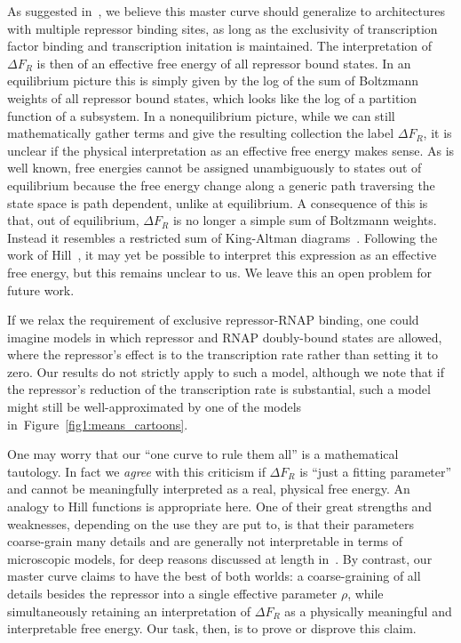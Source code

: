 \documentclass[12pt]{article}%
\newcommand{\fig}[1]{Figure~\ref{#1}}
\begin{document}
As suggested in~\cite{Chure2019}, we believe this master curve
should generalize to architectures with multiple repressor
binding sites, as long as the exclusivity of transcription factor
binding and transcription initation is maintained. The
interpretation of $\Delta F_R$ is then of an effective free
energy of all repressor bound states.
In an equilibrium picture this is simply given by the log of the
sum of Boltzmann weights of all repressor bound states, which
looks like the log of a partition function of a subsystem.
In a nonequilibrium picture, while we can still mathematically gather
terms and give the resulting collection the label $\Delta F_R$,
it is unclear if the physical interpretation as an effective free energy
makes sense.
As is well known, free energies cannot be assigned unambiguously
to states out of equilibrium because the free energy change along
a generic path traversing the state space is path dependent,
unlike at equilibrium.
A consequence of this is that, out of equilibrium, $\Delta F_R$
is no longer a simple sum of Boltzmann weights. Instead it
resembles a restricted sum of King-Altman
diagrams~\cite{King1956, Hill1966}. Following the work of
Hill~\cite{Hill1989}, it may yet be possible to interpret this expression
as an effective free energy, but this remains unclear to us.
We leave this an open problem for future work.

If we relax the requirement of exclusive repressor-RNAP binding,
one could imagine models in which repressor and RNAP doubly-bound
states are allowed, where the repressor's effect is to
 the transcription rate rather than setting it to zero.
Our results do not strictly apply to such a model, although we
note that if the repressor's reduction of the transcription rate
is substantial, such a model might still be well-approximated by
one of the models in~\fig{fig1:means_cartoons}.

One may worry that our ``one curve to rule them all'' is a
mathematical tautology. In fact we \textit{agree} with this
criticism if $\Delta F_R$ is ``just a fitting parameter'' and cannot
be meaningfully interpreted as a real, physical free energy.
An analogy to Hill functions is appropriate here. One of their
great strengths and weaknesses, depending on the use they are put
to, is that their parameters coarse-grain many details and are
generally not interpretable in terms of microscopic models, for
deep reasons discussed at length in~\cite{Frank2013}.
By contrast, our master curve claims to have the best of both worlds:
a coarse-graining of all details besides the repressor into
a single effective parameter $\rho$,
while simultaneously retaining an interpretation of
$\Delta F_R$ as a physically
meaningful and interpretable free energy.
Our task, then, is to prove or disprove this claim.
\end{document}
